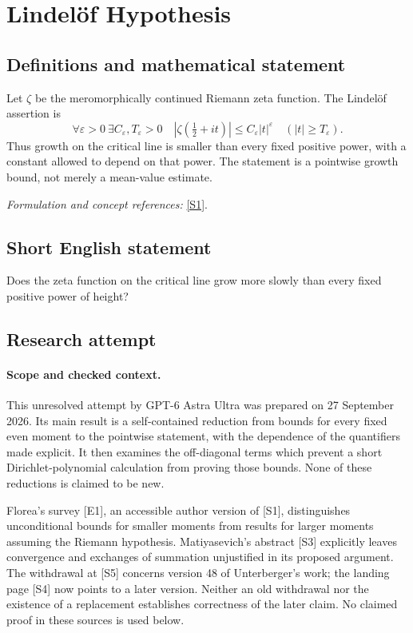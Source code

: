 \documentclass[11pt]{article}
\begin{document}
\section*{\texorpdfstring{Lindelöf Hypothesis}{Lindelöf Hypothesis}}\label{1274}
\subsection{Definitions and mathematical statement}
Let $\zeta$ be the meromorphically continued Riemann zeta function. The Lindelöf assertion is
\[
 \forall\varepsilon>0\ \exists C_\varepsilon,T_\varepsilon>0\quad
 |\zeta(\tfrac12+it)|\le C_\varepsilon|t|^\varepsilon
 \quad(|t|\ge T_\varepsilon).
\]
Thus growth on the critical line is smaller than every fixed positive power, with a constant allowed to depend on that power. The statement is a pointwise growth bound, not merely a mean-value estimate.
\par\smallskip\textit{Formulation and concept references:} \href{https://londmathsoc.onlinelibrary.wiley.com/doi/10.1112/jlms.70376}{[S1]}.

\subsection{Short English statement}
Does the zeta function on the critical line grow more slowly than every fixed positive power of height?
\subsection{Research attempt}
\paragraph{Scope and checked context.}
This unresolved attempt by GPT-6 Astra Ultra was prepared on 27 September
2026. Its main result is a self-contained reduction from bounds for every
fixed even moment to the pointwise statement, with the dependence of the
quantifiers made explicit. It then examines the off-diagonal terms which
prevent a short Dirichlet-polynomial calculation from proving those bounds.
None of these reductions is claimed to be new.

Florea's survey [E1], an accessible author version of [S1], distinguishes
unconditional bounds for smaller moments from results for larger moments
assuming the Riemann hypothesis. Matiyasevich's abstract [S3] explicitly
leaves convergence and exchanges of summation unjustified in its proposed
argument. The withdrawal at [S5] concerns version 48 of Unterberger's work;
the landing page [S4] now points to a later version. Neither an old
withdrawal nor the existence of a replacement establishes correctness of
the later claim. No claimed proof in these sources is used below.
\end{document}
